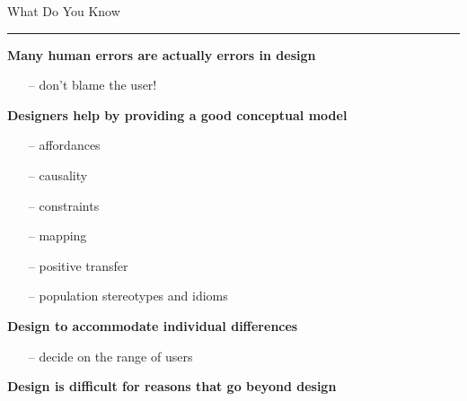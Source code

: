 \documentclass[pdf]{beamer}
\begin{document}
\begin{frame}
	{What Do You Know}{\textcolor{red}{\rule{12cm}{1.2pt}}}
	
    \textbf{Many human errors are actually errors in design}
    \begin{itemize}
        \item[--]don't blame the user!
   \end{itemize}
    \textbf{Designers help by providing a good conceptual model}
    \begin{itemize}
        \item[--]affordances
		\item[--]causality
		\item[--]constraints
		\item[--]mapping
		\item[--]positive transfer
		\item[--]population stereotypes and idioms
   \end{itemize}
    \textbf{Design to accommodate individual differences}
    \begin{itemize}
        \item[--]decide on the range of users
   \end{itemize}
   \textbf {Design is difficult for reasons that go beyond design}
   
\end{frame}




\usetikzlibrary{arrows,positioning} 

\newcommand{\sageatainsus}[7]{

\begin{tikzpicture}
        \node [single arrow,minimum width=#1, minimum height=#2,draw=black, rotate=#7,line width=#5,inner sep=#3] {   };
        \coordinate (P) at (0,0);
        \node[text width=#4] (N) at (P) {#6} ;
		
\end{tikzpicture}

}
\end{document}
